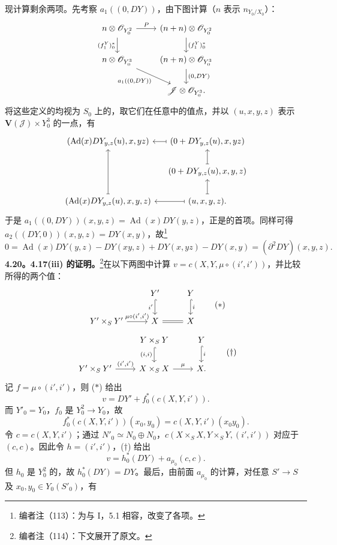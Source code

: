 现计算剩余两项。先考察 $a_1((0,DY))$，由下图计算（$n$ 表示 $n_{Y_0/X_0}$）：
\[
\begin{tikzcd}
n\otimes\mathscr O_{Y_0^2}\arrow[r,"P"]\arrow[d,"(f_1^Y)_0^*"']&(n+n)\otimes\mathscr O_{Y_0^2}\arrow[d,"(f_1^Y)_0^*"]\\
n\otimes\mathscr O_{Y_0^3}\arrow[dr,"{a_1((0,DY))}"']&(n+n)\otimes\mathscr O_{Y_0^3}\arrow[d,"{(0,DY)}"]\\
&\mathscr J\otimes\mathscr O_{Y_0^3}.
\end{tikzcd}
\]
将这些定义的均视为 $S_0$ 上的，取它们在任意中的值点，并以 $(u,x,y,z)$ 表示 $\mathbf V(\mathscr J)\times Y_0^3$ 的一点，有
\[
\begin{tikzcd}[column sep=small]
(\operatorname{Ad}(x)DY_{y,z}(u),x,yz)&(0+DY_{y,z}(u),x,yz)\arrow[l,maps to]\\
&(0+DY_{y,z}(u),x,y,z)\arrow[u,maps to]\\
(\operatorname{Ad}(x)DY_{y,z}(u),x,y,z)\arrow[uu,maps to]&(u,x,y,z)\arrow[l,maps to]\arrow[u,maps to].
\end{tikzcd}
\]
于是 $a_1((0,DY))(x,y,z)=\operatorname{Ad}(x)DY(y,z)$，正是的首项。同样可得 $a_2((DY,0))(x,y,z)=DY(x,y)$，故\footnote{编者注（113）：为与 I，5.1 相容，改变了各项。}
\[0=\operatorname{Ad}(x)DY(y,z)-DY(xy,z)+DY(x,yz)-DY(x,y)=(\partial^2DY)(x,y,z).\]
\textbf{4.20。4.17(iii) 的证明。}\footnote{编者注（114）：下文展开了原文。}在以下两图中计算 $v=c(X,Y,\mu\circ(i',i'))$，并比较所得的两个值：
\[
\begin{tikzcd}
&Y'\arrow[d,hook,"i'"']&Y\arrow[d,hook,"i"]\\
Y'\times_S Y'\arrow[r,"{\mu\circ(i',i')}"]&X\arrow[r,equal]&X
\end{tikzcd}\qquad(*)
\]
\[
\begin{tikzcd}
&Y\times_S Y\arrow[d,hook,"{(i,i)}"']&Y\arrow[d,hook,"i"]\\
Y'\times_S Y'\arrow[r,"{(i',i')}"]&X\times_S X\arrow[r,"\mu"]&X.
\end{tikzcd}\qquad(\dagger)
\]
记 $f=\mu\circ(i',i')$，则 ($*$) 给出
\[v=DY'+f_0^*(c(X,Y,i')).\tag{1}\]
而 $Y'_0=Y_0$，$f_0$ 是 $Y_0^2\to Y_0$，故
\[f_0^*(c(X,Y,i'))(x_0,y_0)=c(X,Y,i')(x_0y_0).\tag{2}\]
令 $c=c(X,Y,i')$；通过 $N'_0\simeq N_0\oplus N_0$，$c(X\times_S X,Y\times_S Y,(i',i'))$ 对应于 $(c,c)$。因此令 $h=(i',i')$，($\dagger$) 给出
\[v=h_0^*(DY)+a_{\mu_0}(c,c).\tag{3}\]
但 $h_0$ 是 $Y_0^2$ 的，故 $h_0^*(DY)=DY$。最后，由前面 $a_{\mu_0}$ 的计算，对任意 $S'\to S$ 及 $x_0,y_0\in Y_0(S'_0)$，有

